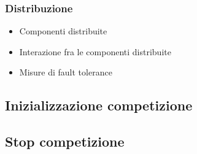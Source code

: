 \subsubsection{Distribuzione}
\begin{itemize}
\item{Componenti distribuite}%
\item{Interazione fra le componenti distribuite}
\item{Misure di fault tolerance}
\end{itemize}
\subsection{Inizializzazione competizione}
\subsection{Stop competizione}
